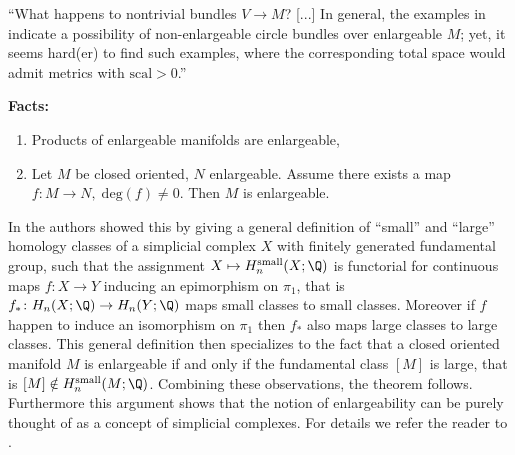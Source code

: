 \begin{question}
``What happens to nontrivial bundles $V \to M$? [...] In general, the examples in \cite{BrunnbauerHanke} indicate a possibility of non-enlargeable circle bundles over enlargeable $M$; yet, it seems hard(er) to find such examples, where the corresponding total space would admit metrics with $\mathrm{scal} > 0$.''
\end{question}

\noindent\textbf{Facts:} \vspace{-.2cm}
\begin{enumerate}[label=(\roman*)] \itshape
    \item Products of enlargeable manifolds are enlargeable, \vspace{-.15cm}
    \item Let $M$ be closed oriented, $N$ enlargeable. Assume there exists a map $f \colon M \to N, \; \mathrm{deg}(f) \neq 0$. Then $M$ is enlargeable.
\end{enumerate}


 In \cite{BrunnbauerHanke} the authors showed this by giving a general definition of ``small'' and ``large'' homology classes of a simplicial complex $X$ with finitely generated fundamental group, such that the assignment $X \mapsto H_n^\mathrm{small}(X;\Q)$ is functorial for continuous maps $f \colon X \to Y$ inducing an epimorphism on $\pi_1$, that is $f_\ast \colon H_n(X;\Q) \to H_n(Y;\Q)$ maps small classes to small classes. Moreover if $f$ happen to induce an isomorphism on $\pi_1$ then $f_\ast$ also maps large classes to large classes. This general definition then specializes to the fact that a closed oriented manifold $M$ is enlargeable if and only if the fundamental class $[M]$ is large, that is $[M] \notin H_n^\mathrm{small}(M;\Q)$. Combining these observations, the theorem follows. Furthermore this argument shows that the notion of enlargeability can be purely thought of as a concept of simplicial complexes. For details we refer the reader to \cite{BrunnbauerHanke}.

